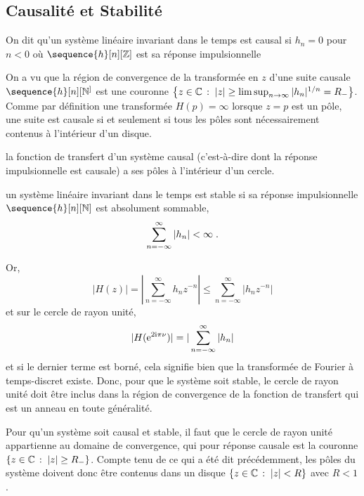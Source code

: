 \subsection{Causalité et Stabilité}
\begin{definition}
On dit qu'un système linéaire invariant dans le temps est causal si $h_n=0$ pour $n < 0$ où $\sequence{h}[n][\zset]$ est sa réponse impulsionnelle 
\end{definition}
On a vu que la région de convergence de la transform\'{e}e en $z$ d'une suite causale $\sequence{h}[n][\nset^]$ 
est une couronne  $\left\{z \in \mathbb{C}\,:\; |z| \geq \limsup_{n \to \infty} |h_n|^{1/n}= R_-\right\}$. Comme par définition
une transform\'{e}e $H(p)= \infty$ lorsque $z= p$ est un pôle, une suite est causale si et seulement si
tous les p\^{o}les sont n\'{e}cessairement contenus \`{a} l'int\'{e}rieur d'un disque.

\begin{proposition}
la fonction de transfert d'un syst\`{e}me causal (c'est-\`{a}-dire dont la r\'{e}ponse impulsionnelle est causale) a ses p\^{o}les \`{a} l'int\'{e}rieur d'un cercle.
\end{proposition}

\begin{definition}
un syst\`{e}me linéaire invariant dans le temps est stable si sa r\'{e}ponse impulsionnelle $\sequence{h}[n][\nset]$ est absolument sommable, 
$$
\sum_{n=-\infty}^{\infty}|h_n|<\infty \;.
$$
\end{definition}
Or,
$$
|H(z)|=|\sum_{n=-\infty}^{\infty}h_n z^{-n}|\leq\sum_{n=-\infty}^{\infty}|h_nz^{-n}|
$$
et sur le cercle de rayon unit\'{e},
$$
|H(\mathrm{e}^{2 \mathrm{i} \pi \nu})|=|\sum_{n=-\infty}^{\infty} |h_n|
$$
et si le dernier terme est born\'{e}, cela signifie bien que la transform\'{e}e de Fourier à temps-discret existe.  Donc, pour que le syst\`{e}me soit stable, le cercle de rayon unit\'{e} doit être inclus dans la région de convergence de la fonction de transfert qui est un anneau en toute g\'{e}n\'{e}ralit\'{e}.

Pour qu'un syst\`{e}me soit causal et stable, il faut que le cercle de rayon unit\'{e} appartienne au domaine de convergence, qui pour réponse causale est la couronne $\left\{z \in \mathbb{C}\,:\; |z| \geq R_-\right\}$. Compte tenu de ce qui a \'{e}t\'{e} dit pr\'{e}c\'{e}demment, les p\^{o}les du syst\`{e}me doivent donc \^{e}tre contenus dans un disque $\left\{z \in \mathbb{C}\,:\; |z| < R\right\}$ avec $R < 1$. 

